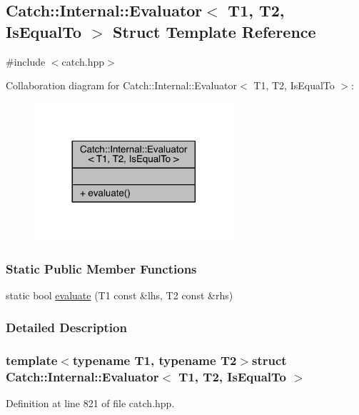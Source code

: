 \hypertarget{a00019}{}\subsection{Catch\+:\+:Internal\+:\+:Evaluator$<$ T1, T2, Is\+Equal\+To $>$ Struct Template Reference}
\label{a00019}


{\ttfamily \#include $<$catch.\+hpp$>$}



Collaboration diagram for Catch\+:\+:Internal\+:\+:Evaluator$<$ T1, T2, Is\+Equal\+To $>$\+:\nopagebreak
\begin{figure}[H]
\begin{center}
\leavevmode
\includegraphics[width=209pt]{a00310}
\end{center}
\end{figure}
\subsubsection*{Static Public Member Functions}
\begin{DoxyCompactItemize}
\item 
static bool \hyperlink{a00019_a166b2b7849247397e63fb2940481b217}{evaluate} (T1 const \&lhs, T2 const \&rhs)
\end{DoxyCompactItemize}


\subsubsection{Detailed Description}
\subsubsection*{template$<$typename T1, typename T2$>$struct Catch\+::\+Internal\+::\+Evaluator$<$ T1, T2, Is\+Equal\+To $>$}



Definition at line 821 of file catch.\+hpp.



